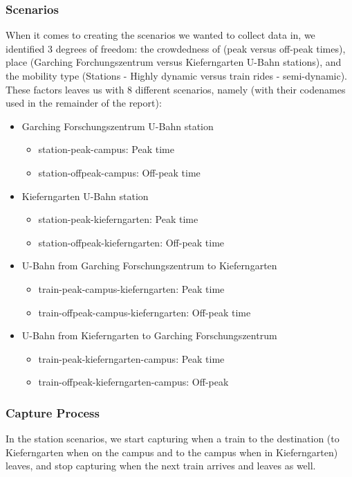 \documentclass[sigconf,nonacm]{acmart}
\begin{document}
\subsubsection{Scenarios}
\label{sec:part-1/scenarios}
When it comes to creating the scenarios we wanted to collect data in, we identified 3 degrees of freedom: the crowdedness of (peak versus off-peak times), place (Garching Forchungszentrum versus Kieferngarten U-Bahn stations), and the mobility type (Stations - Highly dynamic versus train rides - semi-dynamic). These factors leaves us with 8 different scenarios, namely (with their codenames used in the remainder of the report):
\begin{itemize}
    \item Garching Forschungszentrum U-Bahn station
    \begin{itemize}
        \item station-peak-campus: Peak time
        \item station-offpeak-campus: Off-peak time
    \end{itemize}
    \item Kieferngarten U-Bahn station
    \begin{itemize}
        \item station-peak-kieferngarten: Peak time
        \item station-offpeak-kieferngarten: Off-peak time
    \end{itemize}
    \item U-Bahn from Garching Forschungszentrum to Kieferngarten
    \begin{itemize}
        \item train-peak-campus-kieferngarten: Peak time
        \item train-offpeak-campus-kieferngarten: Off-peak time
    \end{itemize}
    \item U-Bahn from Kieferngarten to Garching Forschungszentrum
    \begin{itemize}
        \item train-peak-kieferngarten-campus: Peak time
        \item train-offpeak-kieferngarten-campus: Off-peak
    \end{itemize}
\end{itemize}

\subsubsection{Capture Process}
\label{sec:part-1/da-co/capture}
In the station scenarios, we start capturing when a train to the destination (to Kieferngarten when on the campus and to the campus when in Kieferngarten) leaves, and stop capturing when the next train arrives and leaves as well. 
\end{document}
